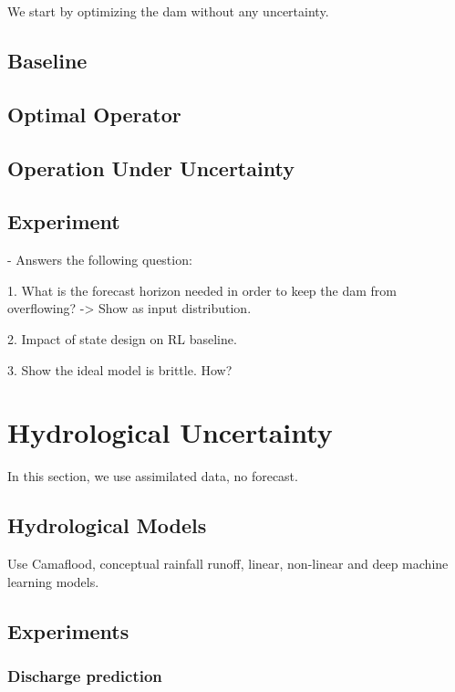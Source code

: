 \documentclass{article}
\begin{document}
We start by optimizing the dam without any uncertainty.

\subsection{Baseline}
\label{sec:Dam Operation baseline}

\subsection{Optimal Operator}
\label{sec:Optimal Operator}

\subsection{Operation Under Uncertainty}
\label{sec:Operation Under Uncertainty}

\subsection{Experiment}
\label{sec:Hydrological Uncertainty}

 - Answers the following question:

1. What is the forecast horizon needed in order to keep the dam from overflowing?
-> Show as input distribution.

2. Impact of state design on RL baseline.

3. Show the ideal model is brittle. How?

\section{Hydrological Uncertainty}
\label{sec:Hydrological Uncertainty}

In this section, we use assimilated data, no forecast.

\subsection{Hydrological Models}
\label{sec:Hydrological Models}

Use Camaflood, conceptual rainfall runoff, linear, non-linear and deep machine learning models.

\subsection{Experiments}
\label{sec:Hydrological Experiments}

\subsubsection{Discharge prediction}
\end{document}
